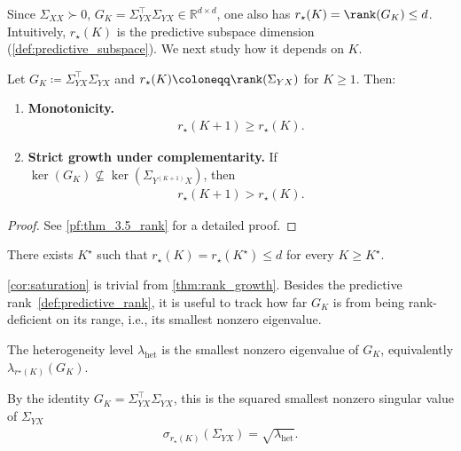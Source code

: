 Since $\Sigma_{XX}\succ 0$, $G_K = \Sigma_{YX}^\top\Sigma_{YX} \in \mathbb R^{d\times d}$,
one also has $r_\star(K) = \rank(G_K) \le d$.
Intuitively, $r_\star(K)$ is the predictive subspace dimension (\cref{def:predictive_subspace}).
We next study how it depends on $K$.
\begin{theorem}
\label{thm:rank_growth}
Let $G_K \coloneqq \Sigma_{YX}^\top \Sigma_{YX}$ and
$r_\star(K) \coloneqq \rank(\Sigma_{YX})$ for $K \ge 1$. Then:
\begin{enumerate}
\item\label{thm:rank_growth:monotone} \textbf{Monotonicity.}
    \begin{align*}
        r_\star(K+1) \ge r_\star(K).
    \end{align*}
\item\label{thm:rank_growth:strict} \textbf{Strict growth under complementarity.} If
    $\ker(G_K) \not\subseteq \ker(\Sigma_{Y^{(K+1)}X})$, then
    \begin{align*}
        r_\star(K+1) > r_\star(K).
    \end{align*}
\end{enumerate}
\end{theorem}
\begin{proof}
    See \cref{pf:thm_3.5_rank} for a detailed proof.
\end{proof}

\begin{corollary}[Saturation]
\label{cor:saturation}
There exists $K^\star$ such that $r_\star(K) = r_\star(K^\star) \le d $ for every $K \ge K^\star$.
\end{corollary}
\cref{cor:saturation} is trivial from \cref{thm:rank_growth}.
Besides the predictive rank~\cref{def:predictive_rank}, it is useful to track how far $G_K$ is from being rank-deficient on its range, i.e., its smallest nonzero eigenvalue.
\begin{definition}
\label{def:heterogeneity}
The heterogeneity level $\lambda_{\mathrm{het}}$ is the smallest nonzero eigenvalue of $G_K$, equivalently $\lambda_{r^\star(K)}(G_K)$. 
\end{definition}
By the identity $G_K = \Sigma_{YX}^\top\Sigma_{YX}$, this is the squared smallest nonzero singular value of $\Sigma_{YX}$
\begin{align}
    \sigma_{r_\star(K)}(\Sigma_{YX}) = \sqrt{\lambda_{\mathrm{het}}}.
    \label{eq:sv_floor}
\end{align}

